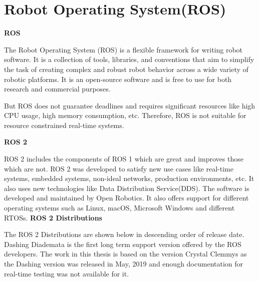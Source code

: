 \documentclass[%
xelatex,
	oneside,		%
	12pt,			%
	parskip=half,	%
	abstracton,
	chapterprefix=true%
    appendixprefix=true]
{scrbook}
\begin{document}
	 \section{Robot Operating System(ROS)}
	 {\bfseries ROS}
	 
The Robot Operating System (ROS) is a flexible framework for writing robot software. It is a collection of tools, libraries, and conventions that aim to simplify the task of creating complex and robust robot behavior across a wide variety of robotic platforms.\cite{ROS}	
It is an open-source software and is free to use for both research and commercial purposes.
 
But ROS does not guarantee deadlines and requires significant resources like high CPU usage, high memory consumption, etc. Therefore, ROS is not suitable for resource constrained real-time systems.

{\bfseries	 ROS 2}

ROS 2 includes the components of ROS 1 which are great and improves those which are not.	ROS 2 was developed to satisfy new use cases like real-time systems, embedded systems, non-ideal networks, production environments, etc. It also uses new technologies like Data Distribution Service(DDS). The software is developed and maintained by Open Robotics.
It also offers support for different operating systems such as Linux, macOS, Microsoft Windows and different RTOSs. 
	 \clearpage
{\bfseries	 ROS 2 Distributions}
	 

The ROS 2 Distributions are shown below in descending order of release date. Dashing Diademata is the first long term support version offered by the ROS developers. The work in this thesis is based on the version Crystal Clemmys as the Dashing version was released in May, 2019 and enough documentation for real-time testing was not available for it. 

 
 
\end{document}
